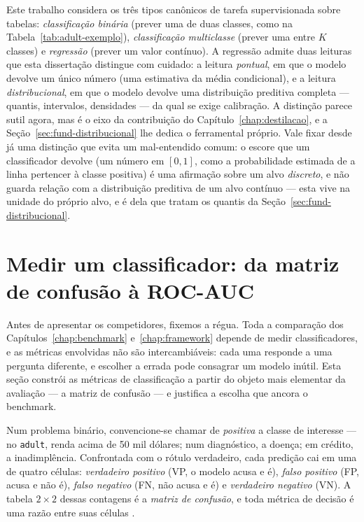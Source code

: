 Este trabalho considera os três tipos
canônicos de tarefa supervisionada sobre tabelas: \emph{classificação
binária} (prever uma de duas classes, como na
Tabela~\ref{tab:adult-exemplo}), \emph{classificação multiclasse} (prever
uma entre $K$ classes) e \emph{regressão} (prever um valor contínuo). A
regressão admite duas leituras que esta dissertação distingue com cuidado:
a leitura \emph{pontual}, em que o modelo devolve um único número (uma
estimativa da média condicional), e a leitura \emph{distribucional}, em que
o modelo devolve uma distribuição preditiva completa --- quantis,
intervalos, densidades --- da qual se exige calibração. A distinção parece
sutil agora, mas é o eixo da contribuição do Capítulo~\ref{chap:destilacao}, e a
Seção~\ref{sec:fund-distribucional} lhe dedica o ferramental próprio.
Vale fixar desde já uma distinção que evita um mal-entendido comum: o
escore que um classificador devolve (um número em $[0,1]$, como a
probabilidade estimada de a linha pertencer à classe positiva) é uma
afirmação sobre um alvo \emph{discreto}, e não guarda relação com a
distribuição preditiva de um alvo contínuo --- esta vive na unidade do
próprio alvo, e é dela que tratam os quantis da
Seção~\ref{sec:fund-distribucional}.

\section{Medir um classificador: da matriz de confusão à ROC-AUC}
\label{sec:fund-metricas-clf}

Antes de apresentar os competidores, fixemos a régua. Toda a comparação
dos Capítulos~\ref{chap:benchmark} e~\ref{chap:framework} depende de medir
classificadores, e as métricas envolvidas não são intercambiáveis: cada
uma responde a uma pergunta diferente, e escolher a errada pode consagrar
um modelo inútil. Esta seção constrói as métricas de classificação a
partir do objeto mais elementar da avaliação --- a matriz de confusão ---
e justifica a escolha que ancora o benchmark.

Num problema binário, convencione-se chamar de \emph{positiva} a classe
de interesse --- no \texttt{adult}, renda acima de 50 mil dólares; num
diagnóstico, a doença; em crédito, a inadimplência. Confrontada com o
rótulo verdadeiro, cada predição cai em uma de quatro células:
\emph{verdadeiro positivo} (VP, o modelo acusa e é), \emph{falso positivo}
(FP, acusa e não é), \emph{falso negativo} (FN, não acusa e é) e
\emph{verdadeiro negativo} (VN). A tabela $2\times 2$ dessas contagens é a
\emph{matriz de confusão}, e toda métrica de decisão é uma razão entre
suas células \citep{hastie2009,fawcett2006}.

